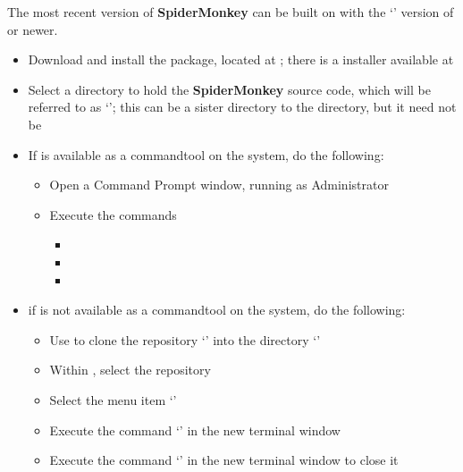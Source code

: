 \tertiaryEnd
{}
The most recent version of \textbf{SpiderMonkey} can be built on \win{} with the
`' version of  or newer.
\begin{itemize}
\item Download and install the  package, located at
;
there is a \win{} installer available at\\
\item\exSp{}Select a directory to hold the \textbf{SpiderMonkey} source code, which will
be referred to as `'; this can be a sister directory to the
 directory, but it need not be
\item\exSp{}If  is available as a command\longDash{}tool on the system, do the
following:
\begin{itemize}
\item Open a Command Prompt window, running as Administrator
\item\exSp{}Execute the commands
\begin{itemize}
\item {}
\item\exSp{}
\item\exSp{}
\end{itemize}
\end{itemize}
\item\exSp{}if  is not available as a command\longDash{}tool on the system, do
the following:
\begin{itemize}
\item\exSp{}Use  to clone the repository
`' into the directory
`'
\item\exSp{}Within , select the 
repository
\item\exSp{}Select the menu item `'
\item\exSp{}Execute the command `' in the new terminal
window
\item\exSp{}Execute the command `' in the new terminal window to close it

\end{itemize}
\end{itemize}
